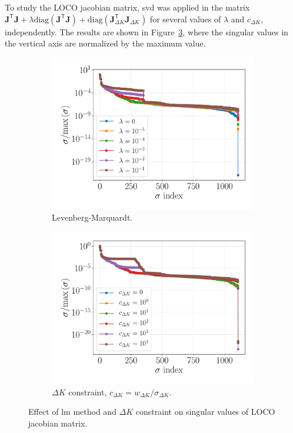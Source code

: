 To study the LOCO jacobian matrix, \gls{svd} was applied in the matrix $\mathbf{J}^{\mathsf{T}}\mathbf{J} + \lambda \mathrm{diag}\left(\mathbf{J}^{\mathsf{T}}\mathbf{J}\right) + \mathrm{diag}\left(\mathbf{J}^{\mathsf{T}}_{\Delta K}\mathbf{J}_{\Delta K}\right)$ for several values of $\lambda$ and ${c}_{\Delta K}$, independently. The results are shown in Figure~\ref{fig:singval}, where the singular values in the vertical axis are normalized by the maximum value.
\begin{figure}
\centering
\begin{subfigure}[t]{0.49\textwidth}
\includegraphics[width=1.0\textwidth]{figures/lm_singular_values_big.pdf}
    \caption{Levenberg-Marquardt.}
    \label{subfig:lm}
\end{subfigure}
 \begin{subfigure}[t]{0.49\textwidth}
\includegraphics[width=1.0\textwidth]{figures/constraint_singular_values_big.pdf}
    \caption{$\Delta K$ constraint, $c_{\Delta K} = w_{\Delta K}/\sigma_{\Delta K}$.}
    \label{subfig:constraint}
\end{subfigure}
\caption{Effect of \gls{lm} method and $\Delta K$ constraint on singular values of LOCO jacobian matrix.}
\label{fig:singval}
\end{figure}

